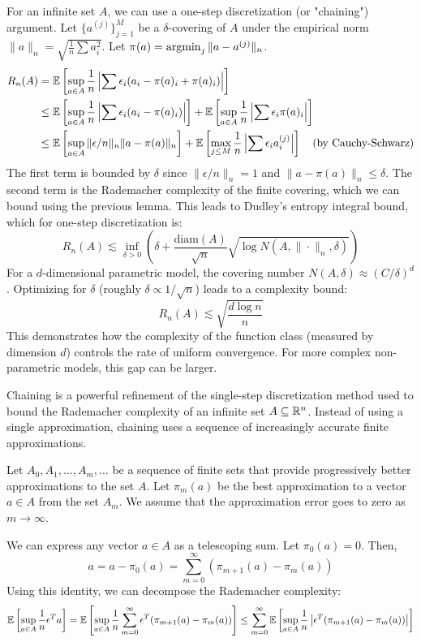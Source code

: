 For an infinite set $A$, we can use a one-step discretization (or "chaining") argument. Let $\{a^{(j)}\}_{j=1}^M$ be a $\delta$-covering of $A$ under the empirical norm $\|a\|_n = \sqrt{\frac{1}{n}\sum a_i^2}$. Let $\pi(a) = \argmin_{j} \|a-a^{(j)}\|_n$.
\begin{align*}
    R_n(A) &= \mathbb{E}\left[\sup_{a \in A} \frac{1}{n} \left| \sum \epsilon_i (a_i - \pi(a)_i + \pi(a)_i) \right| \right] \\
    &\le \mathbb{E}\left[\sup_{a \in A} \frac{1}{n} \left| \sum \epsilon_i (a_i - \pi(a)_i) \right| \right] + \mathbb{E}\left[\sup_{a \in A} \frac{1}{n} \left| \sum \epsilon_i \pi(a)_i \right| \right] \\
    &\le \mathbb{E}\left[\sup_{a \in A} \| \epsilon/n \|_n \| a - \pi(a) \|_n \right] + \mathbb{E}\left[\max_{j \le M} \frac{1}{n} \left| \sum \epsilon_i a_i^{(j)} \right| \right] \quad \text{(by Cauchy-Schwarz)}
\end{align*}
The first term is bounded by $\delta$ since $\|\epsilon/n\|_n = 1$ and $\|a - \pi(a)\|_n \le \delta$. The second term is the Rademacher complexity of the finite covering, which we can bound using the previous lemma. This leads to Dudley's entropy integral bound, which for one-step discretization is:
$$ R_n(A) \lesssim \inf_{\delta > 0} \left( \delta + \frac{\text{diam}(A)}{\sqrt{n}} \sqrt{\log N(A, \|\cdot\|_n, \delta)} \right) $$
For a $d$-dimensional parametric model, the covering number $N(A, \delta) \approx (C/\delta)^d$. Optimizing for $\delta$ (roughly $\delta \propto 1/\sqrt{n}$) leads to a complexity bound:
$$ R_n(A) \lesssim \sqrt{\frac{d \log n}{n}} $$
This demonstrates how the complexity of the function class (measured by dimension $d$) controls the rate of uniform convergence. For more complex non-parametric models, this gap can be larger.

Chaining is a powerful refinement of the single-step discretization method used to bound the Rademacher complexity of an infinite set $A \subseteq \mathbb{R}^n$. Instead of using a single approximation, chaining uses a sequence of increasingly accurate finite approximations.


Let $A_0, A_1, \dots, A_m, \dots$ be a sequence of finite sets that provide progressively better approximations to the set $A$. Let $\pi_m(a)$ be the best approximation to a vector $a \in A$ from the set $A_m$. We assume that the approximation error goes to zero as $m \to \infty$.

We can express any vector $a \in A$ as a telescoping sum. Let $\pi_0(a) = 0$. Then,
$$ a = a - \pi_0(a) = \sum_{m=0}^{\infty} (\pi_{m+1}(a) - \pi_m(a)) $$
Using this identity, we can decompose the Rademacher complexity:
$$ \mathbb{E}\left[\sup_{a \in A} \frac{1}{n} \epsilon^T a \right] = \mathbb{E}\left[\sup_{a \in A} \frac{1}{n} \sum_{m=0}^{\infty} \epsilon^T (\pi_{m+1}(a) - \pi_m(a)) \right] \le \sum_{m=0}^{\infty} \mathbb{E}\left[\sup_{a \in A} \frac{1}{n} \left| \epsilon^T (\pi_{m+1}(a) - \pi_m(a)) \right| \right] $$


